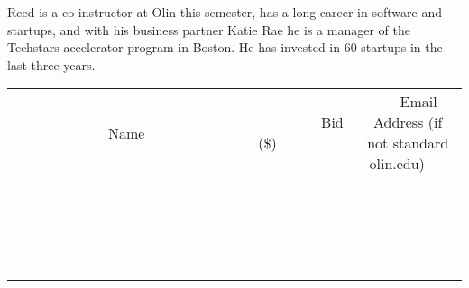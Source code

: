 \documentclass[11pt]{article}
\begin{document}
Reed is a co-instructor at Olin this semester, has a long career in software and startups, and with his business partner Katie Rae he is a manager of the Techstars accelerator program in Boston. He has invested in 60 startups in the last three years.
\\[3ex]
\begin{tabular}{c c c}
~~~~~~~~~~~~~Name~~~~~~~~~~~~~ & ~~~~~~~~~Bid (\$)~~~~~~~~~  & ~~~Email Address (if not standard olin.edu)~~~\\
 & & \\
\hline
 & & \\
\hline
 & & \\
\hline
 & & \\
\hline
 & & \\
\hline
 & & \\
\hline
 & & \\
\hline
 & & \\
\hline
 & & \\
\hline
 & & \\
\hline
 & & \\
\hline
 & & \\
\hline
 & & \\
\hline
 & & \\
\hline
 & & \\
\hline
 & & \\
\hline
 & & \\
\hline
 & & \\
\hline
 & & \\
\hline
\end{tabular}
\newpage
\end{document}
